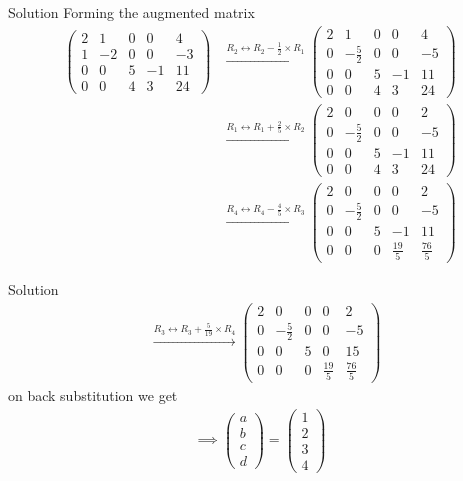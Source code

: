 \documentclass{beamer}
\numberwithin{equation}{section}
\theoremstyle{remark}
\newcommand{\myvec}[1]{\ensuremath{\begin{pmatrix}#1\end{pmatrix}}}
\begin{document}
\begin{frame}{Solution}
Forming the augmented matrix\\
\begin{align}
    \left(\begin{array}{cccc|c}
       2 & 1 & 0 & 0 & 4\\
        1 & -2 & 0 & 0 & -3\\
        0 & 0 & 5 & -1 & 11\\
        0 & 0 & 4 & 3 & 24
\end{array}\right) &\xrightarrow{R_2 \leftrightarrow R_2-\frac{1}{2}\times R_1}
\left(\begin{array}{cccc|c}
       2 & 1 & 0 & 0 & 4\\
        0 & -\frac{5}{2} & 0 & 0 & -5\\
        0 & 0 & 5 & -1 & 11\\
        0 & 0 & 4 & 3 & 24
        \end{array}\right)\\ &\xrightarrow{R_1 \leftrightarrow R_1+\frac{2}{5}\times R_2} \left(\begin{array}{cccc|c}
       2 & 0 & 0 & 0 & 2\\
        0 & -\frac{5}{2} & 0 & 0 & -5\\
        0 & 0 & 5 & -1 & 11\\
        0 & 0 & 4 & 3 & 24
        \end{array}\right)\\ &\xrightarrow{R_4 \leftrightarrow R_4-\frac{4}{5}\times R_3} \left(\begin{array}{cccc|c}
       2 & 0 & 0 & 0 & 2\\
        0 & -\frac{5}{2} & 0 & 0 & -5\\
        0 & 0 & 5 & -1 & 11\\
        0 & 0 & 0 & \frac{19}{5} & \frac{76}{5}
        \end{array}\right)
        \end{align}
        \end{frame}
        \begin{frame}{Solution}
            \begin{align}
         &\xrightarrow{R_3 \leftrightarrow R_3+\frac{5}{19}\times R_4} \left(\begin{array}{cccc|c}
       2 & 0 & 0 & 0 & 2\\
        0 & -\frac{5}{2} & 0 & 0 & -5\\
        0 & 0 & 5 & 0 & 15\\
        0 & 0 & 0 & \frac{19}{5} & \frac{76}{5}
        \end{array}\right)
        \end{align}
        on back substitution we get
        \begin{align}
        \implies \myvec{a\\b\\c\\d}=\myvec{1\\2\\3\\4}
\end{align}
\end{frame}
\end{document}
